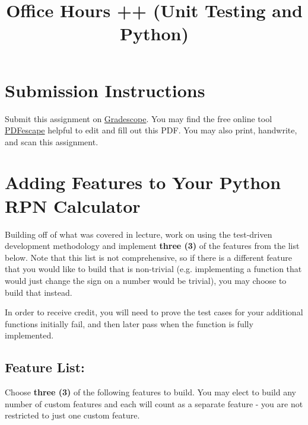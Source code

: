 \documentclass{article}
\begin{document}
\fancyfoot[C]{\color{gray} \thepage~/~\pageref*{LastPage}}
\pagestyle{fancyplain}

\title{\textbf{Office Hours ++ (Unit Testing and Python)\\}}
\author{\textbf{\color{red}{Due: Sunday, November 11th, 11:59PM (Hard Deadline)}}}
\date{}
\maketitle


\section*{Submission Instructions}
Submit this assignment on \href{https://gradescope.com/courses/24368}{Gradescope}.
You may find the free online tool \href{https://www.pdfescape.com}{PDFescape}
helpful to edit and fill out this PDF.
You may also print, handwrite, and scan this assignment.

\section*{Adding Features to Your Python RPN Calculator}

Building off of what was covered in lecture, work on using the test-driven development methodology and implement \textbf{three (3)} of the features from the list below. Note that this list is not comprehensive, so if there is a different feature that you would like to build that is non-trivial (e.g. implementing a function that would just change the sign on a number would be trivial), you may choose to build that instead.

In order to receive credit, you will need to prove the test cases for your additional functions initially fail, and then later pass when the function is fully implemented.

\subsection*{Feature List:}
Choose \textbf{three (3)} of the following features to build. You may elect to build any number of custom features and each will count as a separate feature - you are not restricted to just one custom feature.
\end{document}

